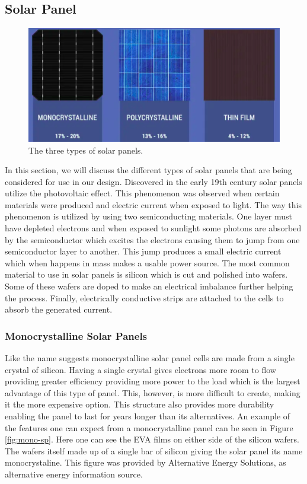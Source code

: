 \subsection{Solar Panel}

\begin{figure}
    \centering
    \includegraphics[scale=0.4]{figures/solar panel overview.png}
    \caption{The three types of solar panels.}
    \label{solar-panel-overview} 
\end{figure}

In this section, we will discuss the different types of solar panels that are being considered for use in our design. Discovered in the early 19th century solar panels utilize the photovoltaic effect. This phenomenon was observed when certain materials were produced and electric current when exposed to light. The way this phenomenon is utilized by using two semiconducting materials. One layer must have depleted electrons and when exposed to sunlight some photons are absorbed by the semiconductor which excites the electrons causing them to jump from one semiconductor layer to another. This jump produces a small electric current which when happens in mass makes a usable power source. The most common material to use in solar panels is silicon which is cut and polished into wafers. Some of these wafers are doped to make an electrical imbalance further helping the process. Finally, electrically conductive strips are attached to the cells to absorb the generated current. 

\subsubsection{Monocrystalline Solar Panels}

Like the name suggests monocrystalline solar panel cells are made from a single crystal of silicon. Having a single crystal gives electrons more room to flow providing greater efficiency providing more power to the load which is the largest advantage of this type of panel. This, however, is more difficult to create, making it the more expensive option. This structure also provides more durability enabling the panel to last for years longer than its alternatives. An example of the features one can expect from a monocrystalline panel can be seen in Figure \ref{fig:mono-sp}. Here one can see the EVA films on either side of the silicon wafers. The wafers itself made up of a single bar of silicon giving the solar panel its name monocrystaline. This figure was provided by Alternative Energy Solutions, as alternative energy information source.

